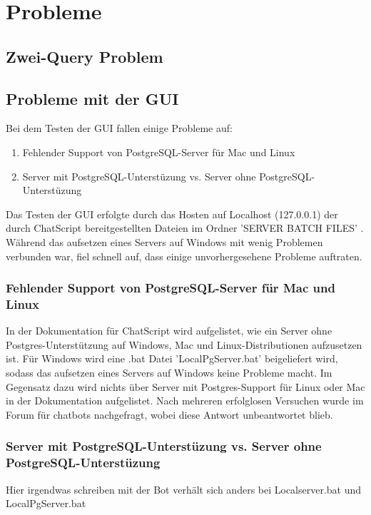 \chapter{Probleme}
\label{sec:Probleme}


\section{Zwei-Query Problem}
\label{Section: Zwei-Query Problem}

\section{Probleme mit der GUI}
\label{sec: Probleme mit der GUI}

Bei dem Testen der GUI fallen einige Probleme auf: 

\begin{enumerate}
\item{Fehlender Support von PostgreSQL-Server für Mac und Linux}
\item{Server mit PostgreSQL-Unterstüzung vs. Server ohne PostgreSQL-Unterstüzung}
\end{enumerate}

Das Testen der GUI erfolgte durch das Hosten auf Localhost (127.0.0.1) der durch ChatScript bereitgestellten Dateien im Ordner 'SERVER BATCH FILES' \citep{chatscript2019}. Während das aufsetzen eines Servers auf Windows mit wenig Problemen verbunden war, fiel schnell auf, dass einige unvorhergesehene Probleme auftraten. 

\subsection{Fehlender Support von PostgreSQL-Server für Mac und Linux}
\label{sec:Fehlender Support von PostgreSQL-Server für Mac und Linux}

In der Dokumentation für ChatScript wird aufgelistet, wie ein Server ohne Postgres-Unterstützung auf Windows, Mac und Linux-Distributionen aufzusetzen ist. Für Windows wird eine .bat Datei 'LocalPgServer.bat' beigeliefert wird, sodass das aufsetzen eines Servers auf Windows keine Probleme macht. Im Gegensatz dazu wird nichts über Server mit Postgres-Support für Linux oder Mac in der Dokumentation aufgelistet. Nach mehreren erfolglosen Versuchen wurde im Forum für chatbots nachgefragt, wobei diese Antwort unbeantwortet blieb. 

\subsection{Server mit PostgreSQL-Unterstüzung vs. Server ohne PostgreSQL-Unterstüzung}
\label{sec: Server mit PostgreSQL-Unterstüzung vs. Server ohne PostgreSQL-Unterstüzung}

Hier irgendwas schreiben mit der Bot verhält sich anders bei Localserver.bat und LocalPgServer.bat

